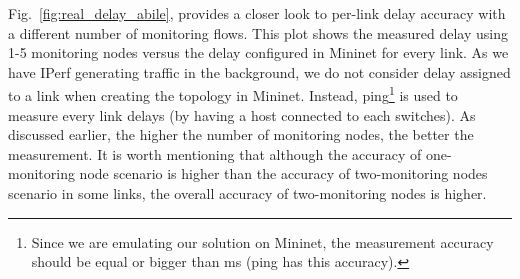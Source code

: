 \documentclass[10pt, journal, letterpaper]{IEEEtran}
\begin{document}
Fig.~\ref{fig:real_delay_abile}, provides a closer look to per-link delay accuracy with a different number of monitoring flows. This plot shows the measured delay using 1-5 monitoring nodes versus the delay configured in Mininet for every link. As we have IPerf generating traffic in the background, we do not consider delay assigned to a link when creating the topology in Mininet. Instead, ping\footnote{Since we are emulating our solution on Mininet, the measurement accuracy should be equal or bigger than ms (ping has this accuracy).} is used to measure every link delays (by having a host connected to each switches). As discussed earlier, the higher the number of monitoring nodes, the better the measurement. It is worth mentioning that although the accuracy of one-monitoring node scenario is higher than the accuracy of two-monitoring nodes scenario in some links, the overall accuracy of two-monitoring nodes is higher. 
\end{document}
